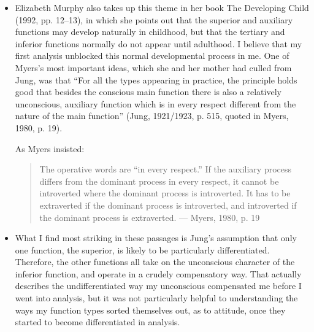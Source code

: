 \begin{itemize}

\item Elizabeth Murphy also takes up this theme in her book The Developing
Child (1992, pp. 12–13), in which she points out that the superior and
auxiliary functions may develop naturally in childhood, but that the tertiary
and inferior functions normally do not appear until adulthood. I believe that
my first analysis unblocked this normal developmental process in me. One of
Myers’s most important ideas, which she and her mother had culled from Jung,
was that “For all the types appearing in practice, the principle holds good
that besides the conscious main function there is also a relatively
unconscious, auxiliary function which is in every respect different from the
nature of the main function” (Jung, 1921/1923, p. 515, quoted in Myers, 1980,
p. 19).

As Myers insisted:
\begin{quote}
The operative words are “in every respect.” If the auxiliary process differs
from the dominant process in every respect, it cannot be introverted where the
dominant process is introverted. It has to be extraverted if the dominant
process is introverted, and introverted if the dominant process is extraverted.
--- Myers, 1980, p. 19
\end{quote}

\item What I find most striking in these passages is Jung’s assumption that
only one function, the superior, is likely to be particularly differentiated.
Therefore, the other functions all take on the unconscious character of the
inferior function, and operate in a crudely compensatory way. That actually
describes the undifferentiated way my unconscious compensated me before I went
into analysis, but it was not particularly helpful to understanding the ways my
function types sorted themselves out, as to attitude, once they started to
become differentiated in analysis.


\end{itemize}
